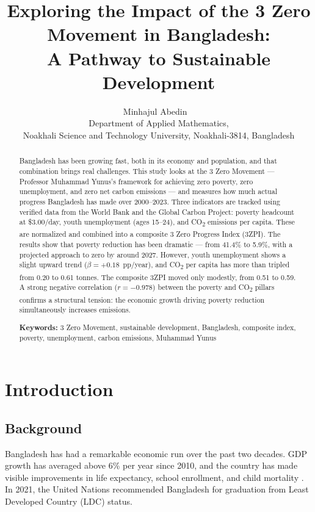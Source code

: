 \documentclass[12pt,a4paper]{article}
\title{Exploring the Impact of the 3 Zero Movement in Bangladesh:\\
A Pathway to Sustainable Development}
\author{Minhajul Abedin ~\orcidlink{0009-0006-5654-632X} \\
\small Department of Applied Mathematics,\\
\small Noakhali Science and Technology University, Noakhali-3814, Bangladesh}
\date{}
\begin{document}
\maketitle

\begin{abstract}
Bangladesh has been growing fast, both in its economy and population, and that combination brings real challenges. This study looks at the 3 Zero Movement --- Professor Muhammad Yunus's framework for achieving zero poverty, zero unemployment, and zero net carbon emissions --- and measures how much actual progress Bangladesh has made over 2000--2023. Three indicators are tracked using verified data from the World Bank and the Global Carbon Project: poverty headcount at \$3.00/day, youth unemployment (ages 15--24), and CO\textsubscript{2} emissions per capita. These are normalized and combined into a composite 3 Zero Progress Index (3ZPI). The results show that poverty reduction has been dramatic --- from 41.4\% to 5.9\%, with a projected approach to zero by around 2027. However, youth unemployment shows a slight upward trend ($\beta = +0.18$~pp/year), and CO\textsubscript{2} per capita has more than tripled from 0.20 to 0.61 tonnes. The composite 3ZPI moved only modestly, from 0.51 to 0.59. A strong negative correlation ($r = -0.978$) between the poverty and CO\textsubscript{2} pillars confirms a structural tension: the economic growth driving poverty reduction simultaneously increases emissions.

\medskip
\noindent\textbf{Keywords:} 3 Zero Movement, sustainable development, Bangladesh, composite index, poverty, unemployment, carbon emissions, Muhammad Yunus
\end{abstract}

\section{Introduction}

\subsection{Background}

Bangladesh has had a remarkable economic run over the past two decades. GDP growth has averaged above 6\% per year since 2010, and the country has made visible improvements in life expectancy, school enrollment, and child mortality \citep{wb2023update}. In 2021, the United Nations recommended Bangladesh for graduation from Least Developed Country (LDC) status.
\end{document}
